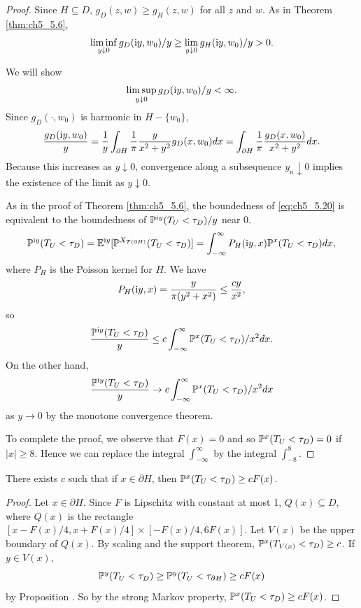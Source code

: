 \begin{proof}
Since $H \subseteq D$, $g_D(z,w) \geq g_H(z,w)$ for all $z$ and $w$. As in Theorem \ref{thm:ch5_5.6},
\[
    \liminf_{y\downarrow 0} g_D(\im y,w_0)/y \geq \lim_{y\downarrow 0} g_H(\im y,w_0)/y > 0.
\]

We will show
\begin{equation}\label{eq:ch5_5.20}
    \limsup_{y\downarrow 0} g_D(\im y,w_0)/y < \infty.
\end{equation}
Since $g_D(\cdot,w_0)$ is harmonic in $H - \{w_0\}$,
\[
    \frac{g_D(\im y,w_0)}{y} = \frac{1}{y}\int_{\partial H} \frac{1}{\pi} \frac{y}{x^2 + y^2}g_D(x,w_0)dx = \int_{\partial H} \frac{1}{\pi} \frac{g_D(x,w_0)}{x^2 + y^2}dx.
\]
Because this increases as $y \downarrow 0$, convergence along a subsequence $y_n \downarrow 0$ implies the existence of the limit as $y \downarrow 0$.

As in the proof of Theorem \ref{thm:ch5_5.6}, the boundedness of \eqref{eq:ch5_5.20} is equivalent to the boundedness of $\P^{iy}(T_U < \tau_D)/y$ near $0$.
\[
    \P^{\im y}(T_U < \tau_D) = \E^{\im y}[\P^{X_{T(\partial H)}}(T_U < \tau_D)] = \int_{-\infty}^{\infty} P_H(\im y,x)\P^x(T_U < \tau_D)dx,
\]
where $P_H$ is the Poisson kernel for $H$. We have
\[
    P_H(\im y,x) = \frac{y}{\pi(y^2 + x^2)} \leq \frac{cy}{x^2},
\]
so
\[
    \frac{\P^{\im y}(T_U < \tau_D)}{y} \leq c\int_{-\infty}^{\infty} \P^x(T_U < \tau_D)/x^2 dx.
\]
On the other hand,
\mpagebreak
\[
    \frac{\P^{\im y}(T_U < \tau_D)}{y} \to c\int_{-\infty}^{\infty} \P^x(T_U < \tau_D)/x^2 dx
\]
as $y \to 0$ by the monotone convergence theorem.

To complete the proof, we observe that $F(x) = 0$ and so $\P^x(T_U < \tau_D) = 0$ if $|x| \geq 8$. Hence we can replace the integral $\int_{-\infty}^{\infty}$ by the integral $\int_{-8}^8$.
\end{proof}

\begin{lemma}\label{lem:ch5_5.10}
There exists $c$ such that if $x \in \partial H$, then $\P^x(T_U < \tau_D) \geq cF(x)$.
\end{lemma}

\begin{proof}
Let $x \in \partial H$. Since $F$ is Lipschitz with constant at most 1, $Q(x) \subseteq D$, where $Q(x)$ is the rectangle $[x-F(x)/4,x+F(x)/4] \times [-F(x)/4,6F(x)]$. Let $V(x)$ be the upper boundary of $Q(x)$. By scaling and the support theorem, $\P^x(T_{V(x)} < \tau_D) \geq c$. If $y \in V(x)$,
\[
    \P^y(T_U < \tau_D) \geq \P^y(T_U < \tau_{\partial H}) \geq cF(x)
\]
by Proposition . So by the strong Markov property, $\P^x(T_U < \tau_D) \geq cF(x)$.
\end{proof}

